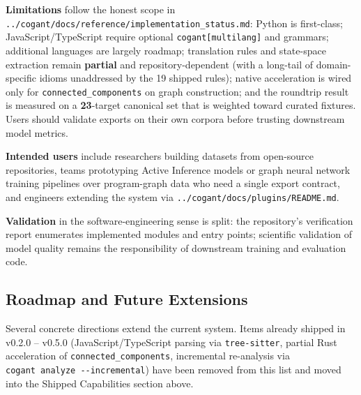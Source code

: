 \documentclass[
]{article}
\begin{document}
\textbf{Limitations} follow the honest scope in
\texttt{../cogant/docs/reference/implementation\_status.md}: Python is
first-class; JavaScript/TypeScript require optional
\texttt{cogant{[}multilang{]}} and grammars; additional languages are
largely roadmap; translation rules and state-space extraction remain
\textbf{partial} and repository-dependent (with a long-tail of
domain-specific idioms unaddressed by the 19 shipped rules); native
acceleration is wired only for \texttt{connected\_components} on graph
construction; and the roundtrip result is measured on a
\textbf{23}-target canonical set that is weighted toward curated
fixtures. Users should validate exports on their own corpora before
trusting downstream model metrics.

\textbf{Intended users} include researchers building datasets from
open-source repositories, teams prototyping Active Inference models or
graph neural network training pipelines over program-graph data who need
a single export contract, and engineers extending the system via
\texttt{../cogant/docs/plugins/README.md}.

\textbf{Validation} in the software-engineering sense is split: the
repository's verification report enumerates implemented modules and
entry points; scientific validation of model quality remains the
responsibility of downstream training and evaluation code.

\subsection{Roadmap and Future
Extensions}\label{roadmap-and-future-extensions}

Several concrete directions extend the current system. Items already
shipped in v0.2.0 -- v0.5.0 (JavaScript/TypeScript parsing via
\texttt{tree-sitter}, partial Rust acceleration of
\texttt{connected\_components}, incremental re-analysis via
\texttt{cogant\ analyze\ -\/-incremental}) have been removed from this
list and moved into the Shipped Capabilities section above.
\end{document}
